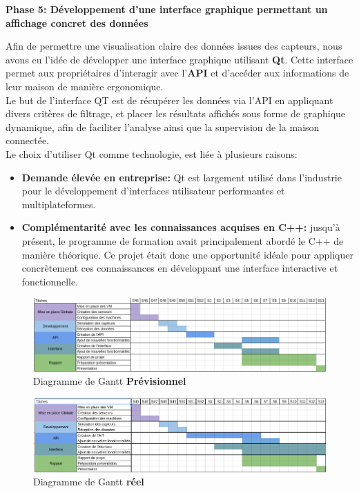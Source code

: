 \documentclass[10pt, a4paper]{report}
\begin{document}
	
	\textbf{Phase 5: Développement d'une interface graphique  permettant un affichage concret des données}
	
	Afin de permettre une visualisation claire des données issues des capteurs, nous avons eu l'idée de développer une interface graphique utilisant \textbf{Qt}. Cette interface permet aux propriétaires d'interagir avec l'\textbf{API}
	et d'accéder aux informations de leur maison de manière ergonomique.\\
	Le but de l'interface QT est de récupérer les données via l'API en appliquant divers critères de filtrage, et placer les résultats affichés sous forme de graphique dynamique, afin de faciliter l'analyse ainsi que la supervision de la maison connectée.\\
	Le choix d'utiliser Qt comme technologie, est liée à plusieurs raisons:\\
	\begin{itemize}
		\item \textbf{Demande élevée en entreprise: } Qt est largement utilisé dans l’industrie pour le développement d’interfaces utilisateur performantes et multiplateformes.
		\item \textbf{Complémentarité avec les connaissances acquises en C++:} jusqu’à présent, le programme de formation avait principalement abordé le C++ de manière théorique. Ce projet était donc une opportunité idéale pour appliquer concrètement ces connaissances en développant une interface interactive et fonctionnelle.
	\end{itemize}
	\vspace{3cm}
	\begin{figure}[h!]
		\centering
		\includegraphics[width=1\textwidth]{ressources/img/Gantt/diagrammePrevisionnel}
		\caption{Diagramme de Gantt \textbf{Prévisionnel}}
		\label{fig:GanttPrevisionnel}
	\end{figure}
		\begin{figure}[h!]
		\centering
		\includegraphics[width=1\textwidth]{ressources/img/Gantt/diagrammeReel}
		\caption{Diagramme de Gantt \textbf{réel}}
		\label{fig:GanttReel}
	\end{figure}
	
\end{document}
